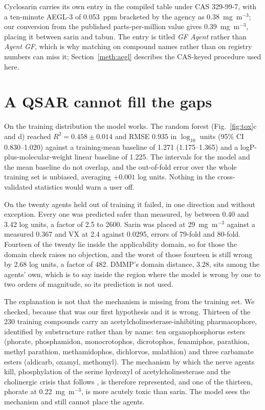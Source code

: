 \documentclass[11pt,a4paper]{article}
\begin{document}
Cyclosarin carries its own entry in the compiled table under CAS 329-99-7, with
a ten-minute AEGL-3 of 0.053~ppm bracketed by the agency as 0.38~mg~m$^{-3}$;
our conversion from the published parts-per-million value gives
0.39~mg~m$^{-3}$, placing it between sarin and tabun. The entry is titled
\textit{GF Agent} rather than \textit{Agent GF}, which is why matching on
compound names rather than on registry numbers can miss it;
Section~\ref{meth:aegl} describes the CAS-keyed procedure used here.

\section{A QSAR cannot fill the gaps}
\label{res:qsar}

On the training distribution the model works. The random forest
(Fig.~\ref{fig:tox}c and d) reached $R^{2}=0.458 \pm 0.014$ and RMSE $0.935$ in
$\log_{10}$ units (95\% CI 0.830--1.020) against a training-mean baseline of
1.271 (1.175--1.365) and a logP-plus-molecular-weight linear baseline of 1.225.
The intervals for the model and the mean baseline do not overlap, and the
out-of-fold error over the whole training set is unbiased, averaging $+0.001$ log
units. Nothing in the cross-validated statistics would warn a user off.

On the twenty agents held out of training it failed, in one direction and without
exception. Every one was predicted safer than measured, by between 0.40 and 3.42
log units, a factor of 2.5 to 2600. Sarin was placed at 29~mg~m$^{-3}$ against a
measured 0.367 and VX at 2.4 against 0.0295, errors of 79-fold and 80-fold.
Fourteen of the twenty lie inside the applicability domain, so for those the
domain check raises no objection, and the worst of those fourteen is still wrong
by 2.68 log units, a factor of 482. DMMP's domain distance, 3.28, sits among the
agents' own, which is to say inside the region where the model is wrong by one to
two orders of magnitude, so its prediction is not used.

\begin{sloppypar}
The explanation is not that the mechanism is missing from the training set. We
checked, because that was our first hypothesis and it is wrong. Thirteen of the
230 training compounds carry an acetylcholinesterase-inhibiting pharmacophore,
identified by substructure rather than by name: ten organophosphorus esters
(phorate, phosphamidon, monocrotophos, dicrotophos, fenamiphos, parathion,
methyl parathion, methamidophos, dichlorvos, malathion) and three carbamate
esters (aldicarb, oxamyl, methomyl). The mechanism by which the nerve agents
kill, phosphylation of the serine hydroxyl of acetylcholinesterase and the
cholinergic crisis that follows \cite{bajgar2004,thiermann2013,worek2020},
is therefore represented, and one of
the thirteen, phorate at 0.22~mg~m$^{-3}$, is more acutely toxic than sarin. The
model sees the mechanism and still cannot place the agents.
\end{sloppypar}
\end{document}
